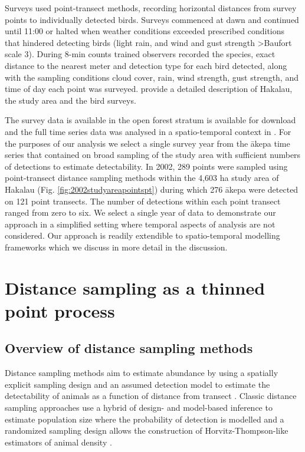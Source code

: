 \documentclass{stylefile16/statsoc}
\newcommand{\akepa}{\textquotesingle\={a}kepa}  %
\begin{document}
Surveys used point-transect methods, recording horizontal distances from survey points to individually detected birds. Surveys commenced at dawn and continued until 11:00 or halted when weather conditions exceeded prescribed conditions that hindered detecting birds (light rain, and wind and gust strength \textgreater Baufort scale 3). During 8-min counts trained observers recorded the species, exact distance to the nearest meter and detection type for each bird detected, along with the sampling conditions cloud cover, rain, wind strength, gust strength, and time of day each point was surveyed.  \cite{camp_population_2010,camp_statespace_2016} provide a detailed description of Hakalau, the study area and the bird surveys.

The survey data is available in the open forest stratum is available for download \citep{camp_datarelease_2002} and the full time series data was analysed in a spatio-temporal context in \citep{camp_dsm_2020}.  For the purposes of our analysis we select a single survey year from the \akepa{} time series that contained on broad sampling of the study area with sufficient numbers of detections to estimate detectability. In 2002, 289 points were sampled using point-transect distance sampling methods within the 4,603 ha study area of Hakalau (Fig. \ref{fig:2002studyareapointspt}) during which 276 \akepa{} were detected on 121 point transects. The number of detections within each point transect ranged from zero to six. We select a single year of data to demonstrate our approach in a simplified setting where temporal aspects of analysis are not considered.  Our approach is readily extendible to spatio-temporal modelling frameworks which we discuss in more detail in the discussion.

\section{Distance sampling as a thinned point process}
\label{sec-ds-pp}

\subsection{Overview of distance sampling methods}

Distance sampling methods aim to estimate abundance by using a spatially explicit sampling design and an assumed detection model to estimate the detectability of animals as a function of distance from transect \citep{buckland_advanced_2004, buckland_distance_2015}.  Classic distance sampling approaches use a hybrid of design- and model-based inference to estimate population size where the probability of detection is modelled and a randomized sampling design allows the construction of Horvitz-Thompson-like estimators of animal density \citep{horvitz_generalization_1952,  buckland_advanced_2004}.
\end{document}

